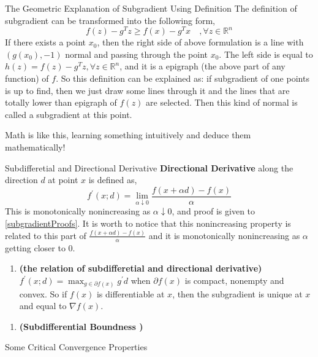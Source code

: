 	\begin{Notes}{The Geometric Explanation of Subgradient Using Definition}{}
		The definition of subgradient can be transformed into the following form,
		$$
		f(z) - g^Tz\ge f(x)-g^Tx\quad,\forall z\in\mathbb{R}^n
		$$
		If there exists a point $x_0$, then the right side of above formulation is a line with $(g(x_0),-1)$ normal and passing through the point $x_0$. The left side is equal to $h(z)=f(z)-g^Tz,\forall z\in\mathbb{R}^n$, and it is a epigraph (the above part of any function) of $f$. 
		So this definition can be explained as: if subgradient of one points is up to find, then we just draw some lines through it and the lines that are totally lower than epigraph of $f(z)$ are selected. Then this kind of normal is called a subgradient at this point.
	\end{Notes}
	Math is like this, learning something intuitively and deduce them mathematically!
	\begin{Properties}{Subdifferetial and Directional Derivative}{}
		\textbf{Directional Derivative} along the direction $d$ at point $x$ is defined as,
		$$
		f^{'}(x;d) = \lim_{\alpha\downarrow 0} \frac{f(x+\alpha d)-f(x)}{\alpha}
		$$
		This is monotonically nonincreasing as $\alpha\downarrow 0$, and proof is given to \ref{subgradientProofs}. It is worth to notice that this nonincreasing property is related to this part of $\frac{f(x+\alpha d)-f(x)}{\alpha}$ and it is monotonically nonincreasing as $\alpha$ getting closer to $0$.
		\begin{enumerate}[]
			\item \textbf{(the relation of subdifferetial and directional derivative)}$f^{'}(x;d) = \max_{g\in\partial f(x)}g^{'}d$ when $\partial f(x)$ is compact, nonempty and convex. So if $f(x)$ is differentiable at $x$, then the subgradient is unique at $x$ and equal to $\nabla f(x)$. \\
		\end{enumerate}
	\end{Properties}

	\begin{Properties}{}{}
		
		\begin{enumerate}
			\item \textbf{(Subdifferential Boundness )}
		\end{enumerate}
	\end{Properties}

	\begin{Properties}{Some Critical Convergence Properties}{}
		
	\end{Properties}
	

